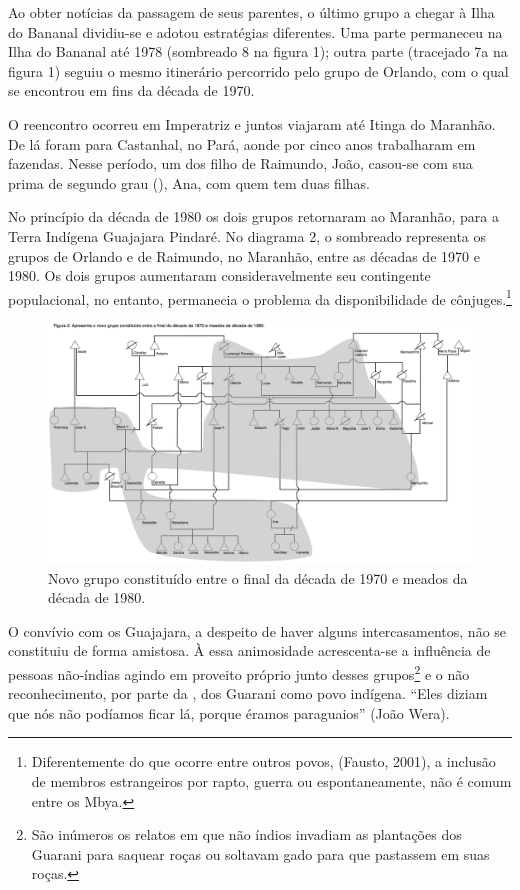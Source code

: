 Ao obter notícias da passagem de seus parentes, o último grupo a chegar
à Ilha do Bananal dividiu-se e adotou estratégias diferentes. Uma parte
permaneceu na Ilha do Bananal até 1978 (sombreado 8 na figura 1); outra
parte (tracejado 7a na figura 1) seguiu o mesmo itinerário percorrido
pelo grupo de Orlando, com o qual se encontrou em fins da década de
1970.

O reencontro ocorreu em Imperatriz e juntos viajaram até Itinga do
Maranhão. De lá foram para Castanhal, no Pará, aonde por cinco anos
trabalharam em fazendas. Nesse período, um dos filho de Raimundo, João,
casou-se com sua prima de segundo grau (), Ana, com quem tem duas
filhas.

No princípio da década de 1980 os dois grupos retornaram ao Maranhão,
para a Terra Indígena Guajajara Pindaré. No diagrama 2, o sombreado
representa os grupos de Orlando e de Raimundo, no Maranhão, entre as
décadas de 1970 e 1980. Os dois grupos aumentaram consideravelmente seu
contingente populacional, no entanto, permanecia o problema da
disponibilidade de cônjuges.\footnote{Diferentemente do que ocorre
entre outros povos, (Fausto, 2001), a inclusão de membros estrangeiros
por rapto, guerra ou espontaneamente, não é comum entre os Mbya.}

\begin{figure}
  \centering
 \includegraphics[width=\textwidth]{./img/GUARANIS-img10.png}	
  \hfill
  \caption{Novo grupo constituído entre o final da década de 1970 e meados da década de 1980.}
\end{figure}
 
 

O convívio com os Guajajara, a despeito de haver alguns intercasamentos,
não se constituiu de forma amistosa. À essa animosidade acrescenta-se a
influência de pessoas não-índias agindo em proveito próprio junto
desses grupos\footnote{São inúmeros os relatos em que não índios
invadiam as plantações dos Guarani para saquear roças ou soltavam gado
para que pastassem em suas roças.} e o não reconhecimento, por parte da
, dos Guarani como povo indígena. ``Eles diziam que nós não
podíamos ficar lá, porque éramos paraguaios'' (João Wera). 

